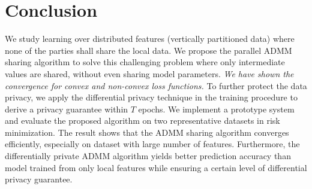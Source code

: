 \section{Conclusion}

We study learning over distributed features (vertically partitioned data) where none of the parties shall share the local data. %
We propose the parallel ADMM sharing algorithm to solve this challenging problem where only intermediate values are shared, without even sharing model parameters. \emph{We have shown the convergence for convex and non-convex loss functions.} To further protect the data privacy, we apply the differential privacy technique in the training procedure to derive a privacy guarantee within $T$ epochs. 
We implement a prototype system and evaluate the proposed algorithm on two representative datasets in risk minimization. The result shows that the ADMM sharing algorithm converges efficiently, especially on dataset with large number of features. Furthermore, the differentially private ADMM algorithm yields better prediction accuracy than model trained from only local features while ensuring a certain level of differential privacy guarantee. 